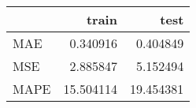 \begin{tabular}{lrr}
\toprule
{} &      train &       test \\
\midrule
MAE  &   0.340916 &   0.404849 \\
MSE  &   2.885847 &   5.152494 \\
MAPE &  15.504114 &  19.454381 \\
\bottomrule
\end{tabular}
